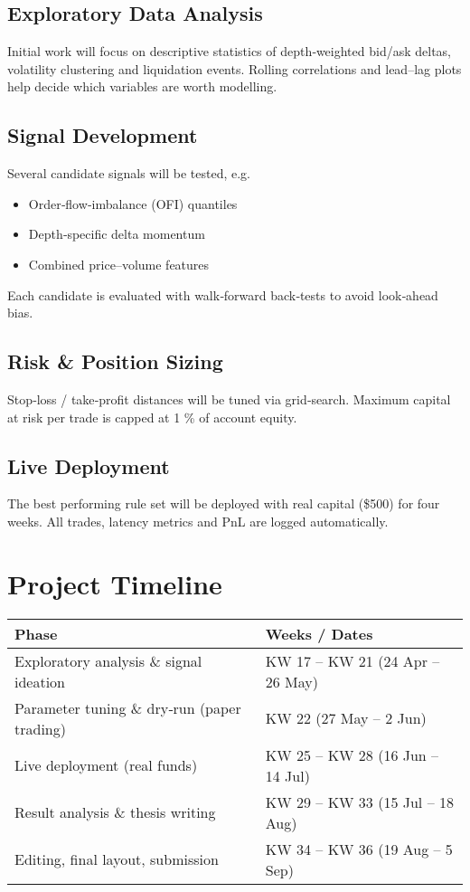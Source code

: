 \documentclass[a4paper,12pt]{article}
\begin{document}
\subsection{Exploratory Data Analysis}

Initial work will focus on descriptive statistics of depth‑weighted
bid/ask deltas, volatility clustering and liquidation events.  
Rolling correlations and lead–lag plots help decide which variables are
worth modelling.

\subsection{Signal Development}

Several candidate signals will be tested, e.g.

\begin{itemize}
  \item Order‑flow‑imbalance (OFI) quantiles
  \item Depth‑specific delta momentum
  \item Combined price–volume features
\end{itemize}

Each candidate is evaluated with walk‑forward back‑tests to avoid
look‑ahead bias.

\subsection{Risk \& Position Sizing}

Stop‑loss / take‑profit distances will be tuned via grid‑search.
Maximum capital at risk per trade is capped at 1 \% of account equity.

\subsection{Live Deployment}

The best performing rule set will be deployed with real capital
(\$500) for four weeks. All trades, latency metrics and
PnL are logged automatically.

\section{Project Timeline}

\begin{tabular}{ll}
\toprule
\textbf{Phase} & \textbf{Weeks / Dates} \\
\midrule
Exploratory analysis \& signal ideation      & KW 17 – KW 21 (24 Apr – 26 May) \\
Parameter tuning \& dry‑run (paper trading)  & KW 22 (27 May – 2 Jun) \\
Live deployment (real funds)                 & KW 25 – KW 28 (16 Jun – 14 Jul) \\
Result analysis \& thesis writing           & KW 29 – KW 33 (15 Jul – 18 Aug) \\
Editing, final layout, submission           & KW 34 – KW 36 (19 Aug – 5 Sep) \\
\bottomrule
\end{tabular}
\end{document}

